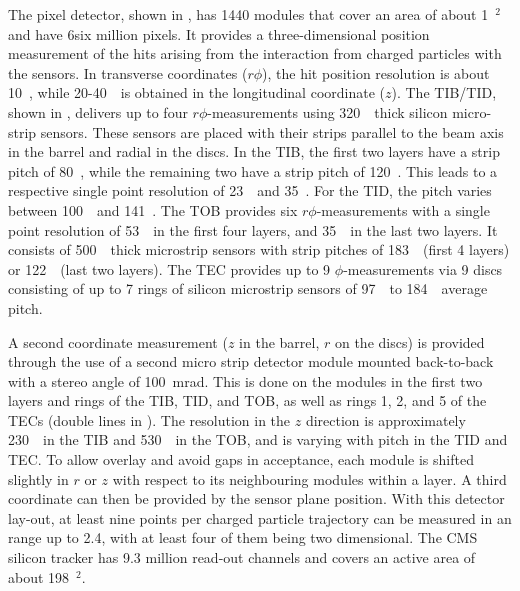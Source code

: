  The pixel detector, shown in , has 1440 modules that cover an area of about 1~\meter$^2$ and have 6six million pixels. It provides a three-dimensional position measurement of the hits arising from the interaction from charged particles with the sensors. In transverse coordinates ($r\phi$), the hit position resolution is about 10~\micro \meter, while 20-40~\micro \meter\ is obtained in the longitudinal coordinate ($z$). 
 The TIB/TID, shown in , delivers up to four $r\phi$-measurements using  320~\micro\meter\ thick silicon micro-strip sensors. These sensors are placed with their strips parallel to the beam axis in the barrel and radial in the discs. In the TIB, the first two layers have a strip pitch of 80~\micro \meter, while the remaining two have a strip pitch of 120~\micro\meter. This leads to a respective single point resolution of 23~\micro\meter\ and 35~\micro\meter. For the TID, the pitch varies between 100~\micro\meter\ and 141~\micro\meter. 
 The TOB provides six $r\phi$-measurements with a single point resolution of 53~\micro\meter\ in the first four layers, and 35~\micro \meter\ in the last two layers. It consists of 500~\micro\meter\ thick microstrip sensors with strip pitches of 183~\micro\meter\ (first 4 layers) or 122~\micro\meter\ (last two layers). The TEC provides up to 9 $\phi$-measurements via 9 discs consisting of up to 7 rings of silicon microstrip sensors of 97~\micro\meter\ to 184~\micro\meter\ average pitch.
 
 A second coordinate measurement ($z$ in the barrel, $r$ on the discs) is provided through the use of a second micro strip detector module mounted back-to-back with a stereo angle of 100~mrad. This is done on the modules in the first two layers and rings of the TIB, TID, and TOB, as well as rings 1, 2, and 5 of the TECs (double lines in ). The resolution in the  $z$ direction is approximately 230~\micro \meter\ in the TIB and 530~\micro \meter\ in the TOB, and is varying with pitch in the TID and TEC.  To allow overlay and avoid gaps in acceptance, each module is shifted slightly in $r$ or $z$ with respect to its neighbouring modules within a layer. A third coordinate can then be provided by the sensor plane position.   With this detector lay-out, at least nine points per charged particle trajectory can be measured in an \abspsrap range up to 2.4, with at least four of them being two dimensional.
 The CMS silicon tracker has 9.3 million read-out channels and covers an active area of about 198~\meter$^2$.  
  

